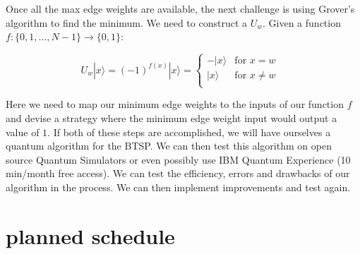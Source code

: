 \documentclass[twocolumn,showpacs,preprintnumbers,amsmath,amssymb]{revtex4}
\begin{document}
	   Once all the max edge weights are available, the next challenge is using Grover's algorithm to find the minimum. We need to construct a  $U_w$. Given a function $f: \{0,1,...,N-1\} \rightarrow \{0,1\}$:
	   
	   \begin{equation}
	   	U_{w}|x\rangle = (-1)^{f(x)}|x\rangle = 
	   	\begin{cases}
	   		-|x\rangle & \text{for  $x=w$ }\\
	   		|x\rangle  & \text{for $x\neq w$}\\
	   	\end{cases}       
	   \end{equation}
		
		Here we need to map our minimum edge weights to the inputs of our function $f$ and devise a strategy where the minimum edge weight input would output a value of $1$. If both of these steps are accomplished, we will have ourselves a quantum algorithm for the BTSP. We can then test this algorithm on open source Quantum Simulators or even possibly use IBM Quantum Experience (10 min/month free access). We can test the efficiency, errors and drawbacks of our algorithm in the process. We can then implement improvements and test again.
		
		
		
		
		\section{planned schedule}
		
		
		
\end{document}
